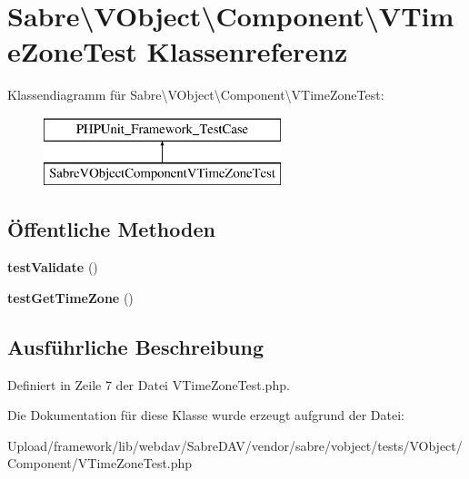 \hypertarget{class_sabre_1_1_v_object_1_1_component_1_1_v_time_zone_test}{}\section{Sabre\textbackslash{}V\+Object\textbackslash{}Component\textbackslash{}V\+Time\+Zone\+Test Klassenreferenz}
\label{class_sabre_1_1_v_object_1_1_component_1_1_v_time_zone_test}
Klassendiagramm für Sabre\textbackslash{}V\+Object\textbackslash{}Component\textbackslash{}V\+Time\+Zone\+Test\+:\begin{figure}[H]
\begin{center}
\leavevmode
\includegraphics[height=2.000000cm]{class_sabre_1_1_v_object_1_1_component_1_1_v_time_zone_test}
\end{center}
\end{figure}
\subsection*{Öffentliche Methoden}
\begin{DoxyCompactItemize}
\item 
\mbox{\label{class_sabre_1_1_v_object_1_1_component_1_1_v_time_zone_test_a77c4b13d8ae191768e1082ac2806af29}} 
{\bfseries test\+Validate} ()
\item 
\mbox{\label{class_sabre_1_1_v_object_1_1_component_1_1_v_time_zone_test_acbb38635bce66fb7a3ecc0ac56076a4b}} 
{\bfseries test\+Get\+Time\+Zone} ()
\end{DoxyCompactItemize}


\subsection{Ausführliche Beschreibung}


Definiert in Zeile 7 der Datei V\+Time\+Zone\+Test.\+php.



Die Dokumentation für diese Klasse wurde erzeugt aufgrund der Datei\+:\begin{DoxyCompactItemize}
\item 
Upload/framework/lib/webdav/\+Sabre\+D\+A\+V/vendor/sabre/vobject/tests/\+V\+Object/\+Component/V\+Time\+Zone\+Test.\+php\end{DoxyCompactItemize}
